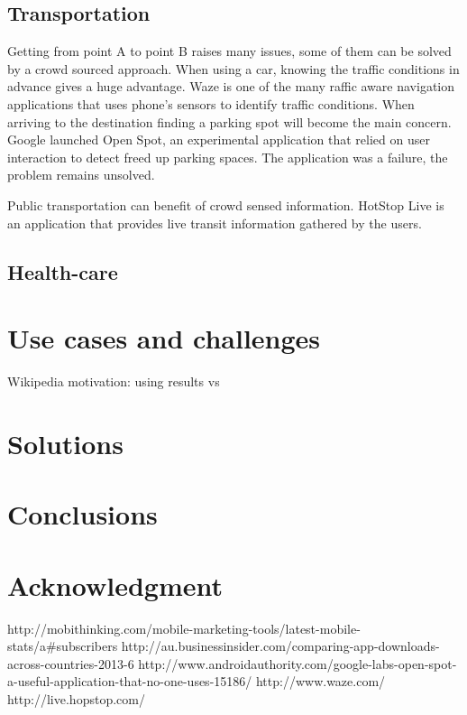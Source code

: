 \documentclass[conference,letterpaper]{IEEEtran}
\begin{document}
\subsection{Transportation}
Getting from point A to point B raises many issues, some of them can be solved by a crowd sourced approach. When using a car, knowing the traffic conditions in advance gives a huge advantage. Waze is one of the many raffic aware navigation applications that uses phone's sensors to identify traffic conditions. When arriving to the destination finding a parking spot will become the main concern. Google launched Open Spot, an experimental application that relied on user interaction to detect freed up parking spaces. The application was a failure, the problem remains unsolved.

Public transportation can benefit of crowd sensed information. HotStop Live is an application that provides live transit information gathered by the users.

\subsection{Health-care}



\section{Use cases and challenges}
\label{sec:use_cases}

Wikipedia motivation: using results vs 
\section{Solutions}
\label{sec:solutions}
\section{Conclusions}
\label{sec:conclusion_and_future_work}
\section{Acknowledgment}
\label{sec:acknowledgment}
http://mobithinking.com/mobile-marketing-tools/latest-mobile-stats/a\#subscribers
http://au.businessinsider.com/comparing-app-downloads-across-countries-2013-6
http://www.androidauthority.com/google-labs-open-spot-a-useful-application-that-no-one-uses-15186/
http://www.waze.com/
http://live.hopstop.com/
\end{document}
